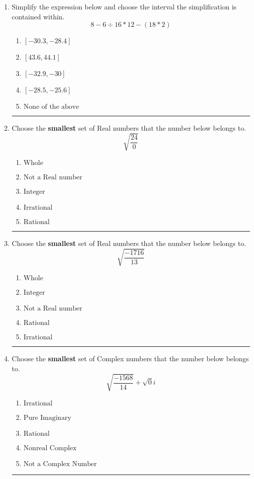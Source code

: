 \documentclass[14pt]{extbook}
\newcommand{\litem}[1]{\item#1\hspace*{-1cm}\rule{\textwidth}{0.4pt}}
\begin{document}
\begin{enumerate}
\litem{
Simplify the expression below and choose the interval the simplification is contained within.\[ 8 - 6 \div 16 * 12 - (18 * 2) \]\begin{enumerate}[label=\Alph*.]
\item \( [-30.3, -28.4] \)
\item \( [43.6, 44.1] \)
\item \( [-32.9, -30] \)
\item \( [-28.5, -25.6] \)
\item \( \text{None of the above} \)

\end{enumerate} }
\litem{
Choose the \textbf{smallest} set of Real numbers that the number below belongs to.\[ \sqrt{\frac{24}{0}} \]\begin{enumerate}[label=\Alph*.]
\item \( \text{Whole} \)
\item \( \text{Not a Real number} \)
\item \( \text{Integer} \)
\item \( \text{Irrational} \)
\item \( \text{Rational} \)

\end{enumerate} }
\litem{
Choose the \textbf{smallest} set of Real numbers that the number below belongs to.\[ \sqrt{\frac{-1716}{13}} \]\begin{enumerate}[label=\Alph*.]
\item \( \text{Whole} \)
\item \( \text{Integer} \)
\item \( \text{Not a Real number} \)
\item \( \text{Rational} \)
\item \( \text{Irrational} \)

\end{enumerate} }
\litem{
Choose the \textbf{smallest} set of Complex numbers that the number below belongs to.\[ \sqrt{\frac{-1568}{14}}+\sqrt{0}i \]\begin{enumerate}[label=\Alph*.]
\item \( \text{Irrational} \)
\item \( \text{Pure Imaginary} \)
\item \( \text{Rational} \)
\item \( \text{Nonreal Complex} \)
\item \( \text{Not a Complex Number} \)


\end{enumerate}}
\end{enumerate}
\end{document}
